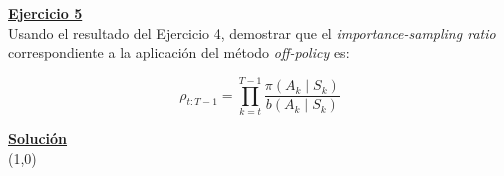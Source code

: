 \indent\underline{\textbf{Ejercicio 5}}\\
Usando el resultado del Ejercicio 4, demostrar que el \textit{importance-sampling ratio} correspondiente a la aplicación del método \textit{off-policy} es:

\[
    \rho_{t:T-1} = \prod_{k=t}^{T-1} \frac{\pi(A_k \mid S_k)}{b(A_k \mid S_k)}
\]

\indent\underline{\textbf{Solución}}\\

\line(1,0){\textwidth}
